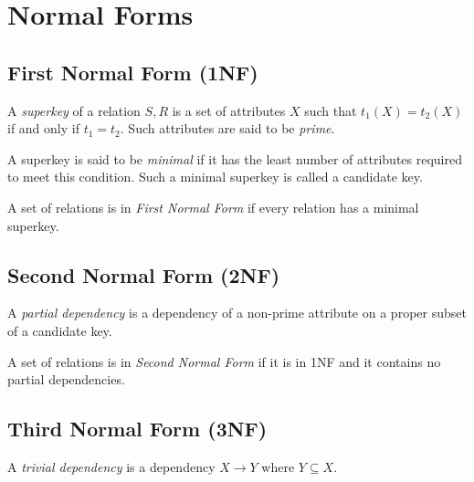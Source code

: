 \chapter{Normal Forms}

\section{First Normal Form (1NF)}

\begin{definition}

A \emph{superkey} of a relation $S,R$ is a set of attributes $X$ such
that $t_1(X) = t_2(X)$ if and only if $t_1 = t_2$.  Such attributes
are said to be \emph{prime}.  

A superkey is said to be \emph{minimal} if it has the least number of
attributes required to meet this condition.  Such a minimal superkey
is called a candidate key.

\end{definition}

\begin{definition}

A set of relations is in \emph{First Normal Form} if every relation
has a minimal superkey.

\end{definition}

\section{Second Normal Form (2NF)}

\begin{definition}

A \emph{partial dependency} is a dependency of a non-prime attribute
on a proper subset of a candidate key.

\end{definition}

\begin{definition}

A set of relations is in \emph{Second Normal Form} if it is in 1NF and
it contains no partial dependencies.

\end{definition}

\section{Third Normal Form (3NF)}

\begin{definition}

A \emph{trivial dependency} is a dependency $X \rightarrow Y$ where $Y
\subseteq X$.

\end{definition}

